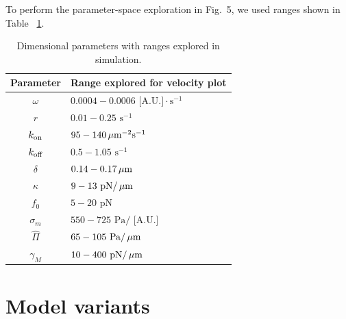 To perform the parameter-space exploration in Fig.~5, we used ranges shown in Table ~\ref{tab:parameterranges}. 
\begin{table}[h!]
\caption{Dimensional parameters with ranges explored in simulation.}\centering \label{tab:parameterranges} 
\begin{tabular}{cl}
\hline
{Parameter} & {Range explored for velocity plot}\\
\hline
$\omega$   &  $0.0004-0.0006 \text{ [A.U.]} \cdot \text{s}^{-1}$ \\
$r$  & $0.01-0.25 \text{ s}^{-1}$ \\
$k_{\mbox{\scriptsize on}}$  & $95-140  \,\mu\mbox{m}^{-2}\text{s}^{-1}$\\
$k_{\mbox{\scriptsize off}}$ & $0.5-1.05 \text{ s}^{-1}$\\
$\delta$ &  $0.14-0.17  \,\mu\mbox{m}$\\
$\kappa$ & $9-13 \text{ pN/$\,\mu\mbox{m}$}$\\
$f_0$ & $5-20 \text{ pN}$ \\
$\sigma_m$  & $550-725\text{ Pa/ [A.U.]}$\\
$\hat{\Pi}$ & $65-105\text{  Pa/$\,\mu\mbox{m}$}$\\
$\gamma_M$ & $10-400 \text{ pN/$\,\mu\mbox{m}$}$\\
\hline
\end{tabular} 
\end{table}
\section{Model variants}

%
%
%

